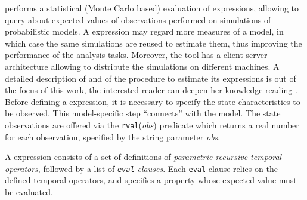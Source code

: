 \documentclass[12pt,a4paper,twoside,openright]{book}
\begin{document}
\multivesta{} performs a statistical (Monte Carlo based) evaluation of \multiquatex{} expressions, allowing to query about expected values of observations performed on simulations of probabilistic models. 
%
A \multiquatex{} expression may regard more measures of a model, in which case the same simulations are reused to estimate them, thus improving the performance of the analysis tasks. %
Moreover, the tool has a client-server architecture allowing to distribute the simulations on different machines.
%
A detailed description of \multiquatex{} and of the procedure to estimate its expressions is out of the focus of this work, the interested reader can deepen her knowledge reading \cite{multivesta,AghaMS06}.
%
Before defining a \multiquatex{} expression, it is necessary to specify the state characteristics to be observed.
%
This model-specific step ``connects'' \multiquatex{} with the model.
%
The state observations are offered via the \texttt{{rval}}(\emph{obs}) predicate which returns a real number for each observation, specified by the string parameter \emph{obs}. 

A \multiquatex{} expression consists of a set of definitions of \emph{parametric recursive temporal operators}, followed by a list of \emph{\texttt{eval} clauses}. Each \texttt{eval} clause relies on the defined temporal operators, and specifies a property whose expected value must be evaluated.
\end{document}
